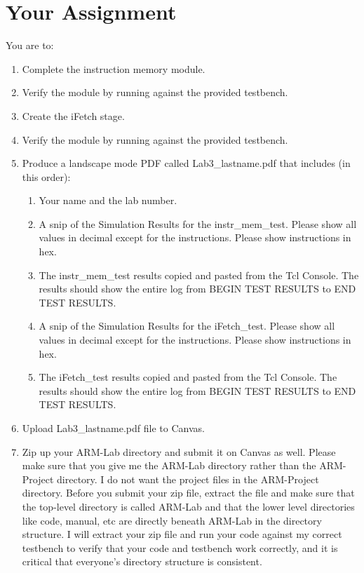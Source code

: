 \section{Your Assignment}
You are to:
\begin{enumerate}
\item Complete the instruction memory module.
\item Verify the module by running against the provided testbench.
\item Create the iFetch stage.
\item Verify the module by running against the provided testbench.
\item Produce a landscape mode PDF called Lab3\_lastname.pdf that includes (in this order):
\begin{enumerate}
\item Your name and the lab number.
\item A snip of the Simulation Results for the instr\_mem\_test.  Please show all values in decimal except for the instructions.  Please show instructions in hex.
\item The instr\_mem\_test results copied and pasted from the Tcl Console.  The results should show the entire log from BEGIN TEST RESULTS to END TEST RESULTS.
\item A snip of the Simulation Results for the iFetch\_test.  Please show all values in decimal except for the instructions.  Please show instructions in hex.  
\item The iFetch\_test results copied and pasted from the Tcl Console.  The results should show the entire log from BEGIN TEST RESULTS to END TEST RESULTS.
\end{enumerate}
\item Upload Lab3\_lastname.pdf file to Canvas.
\item Zip up your ARM-Lab directory and submit it on Canvas as well.  Please make sure that you give me the ARM-Lab directory rather than the ARM-Project directory.  I do not want the project files in the ARM-Project directory.  Before you submit your zip file, extract the file and make sure that the top-level directory is called ARM-Lab and that the lower level directories like code, manual, etc are directly beneath ARM-Lab in the directory structure.  I will extract your zip file and run your code against my correct testbench to verify that your code and testbench work correctly, and it is critical that everyone's directory structure is consistent.
\end{enumerate} 